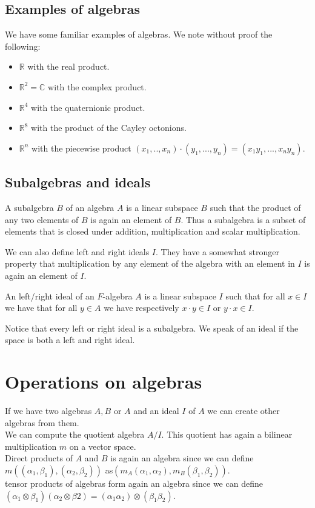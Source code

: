 \documentclass[../Thesis.tex]{subfiles}
\begin{document}
\subsection{Examples of algebras}
We have some familiar examples of algebras. We note without proof the following:
\begin{itemize}
\item $\mathbb{R}$ with the real product.
\item $\mathbb{R}^2 = \mathbb{C}$ with the complex product.
\item $\mathbb{R}^ 4$ with the quaternionic product.
\item $\mathbb{R}^ 8$ with the product of the Cayley octonions.
\item $\mathbb{R}^n$ with the piecewise product $(x_1,..,x_n) \cdot (y_1,...,y_n) = (x_1y_1,...,x_ny_n)$.
\end{itemize}

\subsection{Subalgebras and ideals}
\begin{mydef}
A subalgebra $B$ of an algebra $A$ is a linear subspace $B$ such that the product of any two elements of $B$ is again an element of $B$. Thus a subalgebra is a subset of elements that is closed under addition, multiplication and scalar multiplication.
\end{mydef}
We can also define left and right ideals $I$. They have a somewhat stronger property that multiplication by any element of the algebra with an element in $I$ is again an element of $I$.
\begin{mydef}
An left/right ideal of an $F$-algebra $A$ is a linear subspace $I$ such that for all $x \in I$ we have that for all $y \in A$ we have respectively $x\cdot y \in I$ or $y \cdot x \in I$.
\end{mydef}
Notice that every left or right ideal is a subalgebra. We speak of an ideal if the space is both a left and right ideal.
\section{Operations on algebras}
If we have two algebras $A,B$ or $A$ and an ideal $I$ of $A$ we can create other algebras from them.
\\We can compute the quotient algebra $A/I$. This quotient has again a bilinear multiplication $m$ on a vector space.
\\Direct products of $A$ and $B$ is again an algebra since we can define $m((\alpha_1,\beta_1), (\alpha_2,\beta_2))$  as$ (m_A(\alpha_1,\alpha_2), m_B(\beta_1, \beta_2))$.
\\tensor products of algebras form again an algebra since we can define $(\alpha_1 \otimes \beta_1)(\alpha_2 \otimes \beta2) = (\alpha_1\alpha_2) \otimes (\beta_1\beta_2)$.
\end{document}
